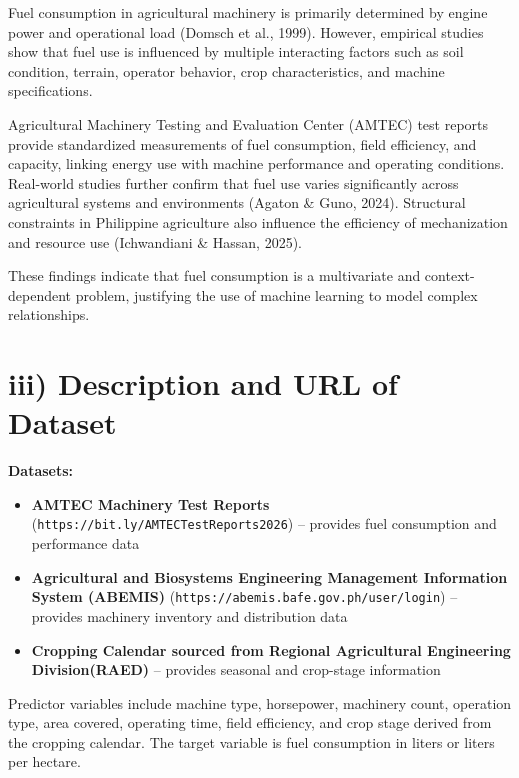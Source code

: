 \documentclass[10pt,twocolumn]{article}
\begin{document}
Fuel consumption in agricultural machinery is primarily determined by engine power and operational load (Domsch et al., 1999). However, empirical studies show that fuel use is influenced by multiple interacting factors such as soil condition, terrain, operator behavior, crop characteristics, and machine specifications.

\vspace{10pt}

Agricultural Machinery Testing and Evaluation Center (AMTEC) test reports provide standardized measurements of fuel consumption, field efficiency, and capacity, linking energy use with machine performance and operating conditions. Real-world studies further confirm that fuel use varies significantly across agricultural systems and environments (Agaton \& Guno, 2024). Structural constraints in Philippine agriculture also influence the efficiency of mechanization and resource use (Ichwandiani \& Hassan, 2025).

\vspace{10pt}

These findings indicate that fuel consumption is a multivariate and context-dependent problem, justifying the use of machine learning to model complex relationships.

\vspace{10pt}

\section*{\small iii) Description and URL of Dataset}

\textbf{Datasets:}
\begin{itemize}
\item \textbf{\small AMTEC Machinery Test Reports} (\texttt{https://bit.ly/AMTECTestReports2026}) 
– provides fuel consumption and performance data
\item \textbf{\small Agricultural and Biosystems Engineering Management Information System (ABEMIS)} (\texttt{https://abemis.bafe.gov.ph/user/login}) 
– provides machinery inventory and distribution data
\item \textbf{\small Cropping Calendar sourced from Regional Agricultural Engineering Division(RAED)} 
– provides seasonal and crop-stage information
\end{itemize}

\vspace{10pt}

Predictor variables include machine type, horsepower, machinery count, operation type, area covered, operating time, field efficiency, and crop stage derived from the cropping calendar. The target variable is fuel consumption in liters or liters per hectare.
\end{document}
